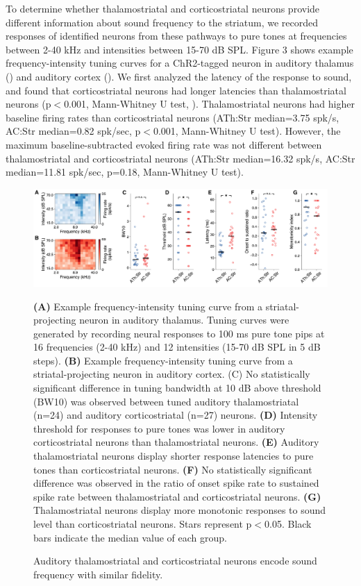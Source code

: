 To determine whether thalamostriatal and corticostriatal neurons provide different information about sound frequency to the striatum, we recorded responses of identified neurons from these pathways to pure tones at frequencies between 2-40 kHz and intensities between 15-70 dB SPL. 
%
Figure 3 shows example frequency-intensity tuning curves for a ChR2-tagged neuron in auditory thalamus (\fig{\FrequencyThalExample}) and auditory cortex (\fig{\FrequencyACExample}).
%
We first analyzed the latency of the response to sound, and found that corticostriatal neurons had longer latencies than thalamostriatal neurons (p$<$0.001, Mann-Whitney U test, \fig{\FrequencyLatency}). 
%
Thalamostriatal neurons had higher baseline firing rates than corticostriatal neurons (ATh:Str median=3.75 spk/s, AC:Str median=0.82 spk/sec, p$<$0.001, Mann-Whitney U test). 
%
However, the maximum baseline-subtracted evoked firing rate was not different between thalamostriatal and corticostriatal neurons (ATh:Str median=16.32 spk/s, AC:Str median=11.81 spk/sec, p=0.18, Mann-Whitney U test). 

\begin{figure}[hp]
  \begin{center}
    \includegraphics[width=6in]{figures/chapter3/fig4_frequency}%
  \end{center}
\caption{Auditory thalamostriatal and corticostriatal neurons encode sound frequency with similar fidelity.}{\textbf{(A)} Example frequency-intensity tuning curve from a striatal-projecting neuron in auditory thalamus.
%
Tuning curves were generated by recording neural responses to 100 ms pure tone pips at 16 frequencies (2-40 kHz) and 12 intensities (15-70 dB SPL in 5 dB steps). 
%
\textbf{(B)} Example frequency-intensity tuning curve from a striatal-projecting neuron in auditory cortex. 
%
(C) No statistically significant difference in tuning bandwidth at 10 dB above threshold (BW10) was observed between tuned auditory thalamostriatal (n=24) and auditory corticostriatal (n=27) neurons. 
%
\textbf{(D)} Intensity threshold for responses to pure tones was lower in auditory corticostriatal neurons than thalamostriatal neurons. 
%
\textbf{(E)} Auditory thalamostriatal neurons display shorter response latencies to pure tones than corticostriatal neurons. 
%
\textbf{(F)} No statistically significant difference was observed in the ratio of onset spike rate to sustained spike rate between thalamostriatal and corticostriatal neurons.
%
\textbf{(G)} Thalamostriatal neurons display more monotonic responses to sound level than corticostriatal neurons.
%
Stars represent p$<$0.05. Black bars indicate the median value of each group.
}
\end{figure}

